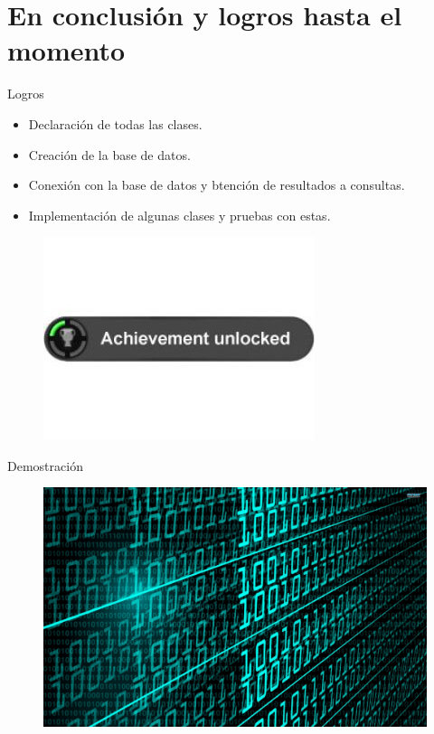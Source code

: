 \documentclass[10pt]{beamer}
\begin{document}
\section{En conclusión y logros hasta el momento }
\begin{frame}{Logros}
\begin{block}{}
\begin{itemize}
         \item Declaración de todas las clases.
         \item Creación de la base de datos.
         \item Conexión con la base de datos y btención de resultados a
            consultas.
        \item Implementación de algunas clases y pruebas con estas.

\end{itemize}


\begin{figure}[!h]
\begin{center}
\includegraphics[width=.4\textwidth]{./AAUgraphics/logro.jpg}
\end{center}
\end{figure}

\end{block}
\end{frame}






\begin{frame}{Demostración}{}
\begin{block}{}
\begin{figure}[!h]
\begin{center}
\includegraphics[width=.9\textwidth]{./AAUgraphics/code.jpg}
\end{center}
\end{figure}
\end{block}
\end{frame}
\end{document}
